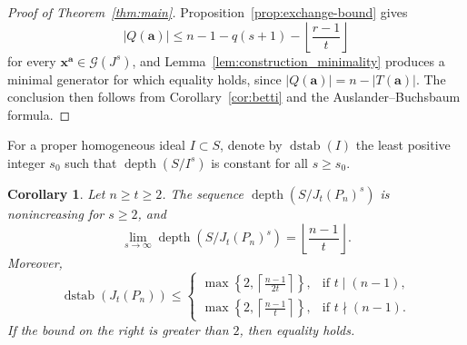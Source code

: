 \documentclass[12pt]{amsart}
\newtheorem{corollary}[theorem]{Corollary}
\theoremstyle{definition}
\theoremstyle{remark}
\numberwithin{equation}{section}
\DeclareMathOperator{\depth}{depth}
\begin{document}
\begin{proof}[Proof of Theorem~\ref{thm:main}]
Proposition~\ref{prop:exchange-bound} gives
\[
|Q(\mathbf{a})| \le n - 1 - q(s+1) - \left\lfloor \frac{r-1}{t} \right\rfloor
\]
for every $\mathbf{x}^{\mathbf{a}} \in \mathcal{G}(J^s)$, and Lemma~\ref{lem:construction_minimality} produces a minimal generator for which equality holds, since $|Q(\mathbf{a})| = n - |T(\mathbf{a})|$. The conclusion then follows from Corollary~\ref{cor:betti} and the Auslander--Buchsbaum formula.
\end{proof}

For a proper homogeneous ideal $I\subset S$, denote by
$\operatorname{dstab}(I)$ the least positive integer $s_0$ such that
$\depth(S/I^s)$ is constant for all $s\ge s_0$.

\begin{corollary}\label{cor:depth-stability}
Let $n\ge t\ge2$. The sequence
$\depth(S/J_t(P_n)^s)$ is nonincreasing for $s\ge2$, and
\[
\lim_{s\to\infty}\depth(S/J_t(P_n)^s)
=
\left\lfloor\frac{n-1}{t}\right\rfloor.
\]
Moreover,
\[
\operatorname{dstab}(J_t(P_n))
\le
\begin{cases}
\displaystyle
\max\left\{2,\left\lceil\frac{n-1}{2t}\right\rceil\right\},
& \text{if }t\mid(n-1),\\[6pt]
\displaystyle
\max\left\{2,\left\lceil\frac{n-1}{t}\right\rceil\right\},
& \text{if }t\nmid(n-1).
\end{cases}
\]
If the bound on the right is greater than $2$, then equality holds.
\end{corollary}
\end{document}
